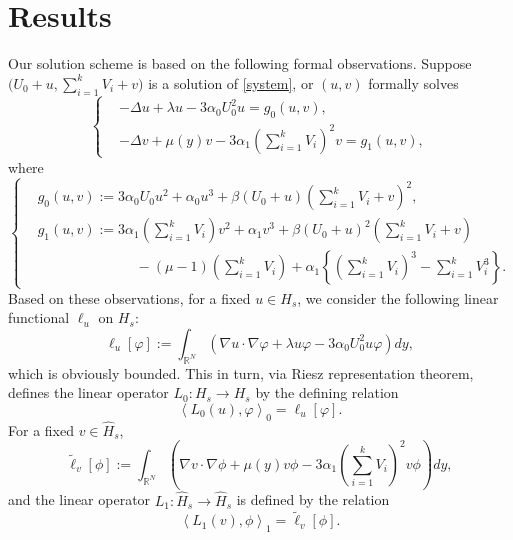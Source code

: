 \documentclass{amsart}
\theoremstyle{definition}
\theoremstyle{remark}
\numberwithin{equation}{section}
\begin{document}
\section{Results} \label{sec:result}
Our solution scheme is based on the following formal observations. Suppose $\Big(U_0 +u, \displaystyle \sum_{i=1}^k V_i + v\Big)$ is a solution of \eqref{system}, or $(u,v)$ formally solves
\begin{equation*}
 \left\{
 \begin{aligned}
 &-\Delta u + \lambda u - 3\alpha_0U_0^2 u =g_0(u,v),  \\
 &-\Delta v + \mu(y) v - 3\alpha_1\left(\sum_{i=1}^k V_{i}\right)^2 v =g_1(u,v),  
 \end{aligned}
 \right.
\end{equation*}
where
\begin{equation*}
 \left\{
 \begin{aligned}
 & g_0(u,v):=3\alpha_0U_{ {0}} u^2 + \alpha_0u^3 + \beta(U_0+u)\left(\sum_{i=1}^k V_{i} +v\right)^2,\\
 & g_1(u,v):= 3\alpha_1\left(\sum_{i=1}^k V_{i}\right)v^2 + \alpha_1v^3 + \beta\left(U_0 +u\right)^2\left(\sum_{i=1}^k V_{i} +v\right)  \\
 & \quad \quad \quad \quad \quad \quad \quad - (\mu-1)\left(\sum_{i=1}^k V_{i}\right)+ \alpha_1\left\{ \left(\sum_{i=1}^k V_{i}\right)^3 - \sum_{i=1}^k V_{i}^3 \right\}.
 \end{aligned}
 \right.
\end{equation*}
Based on these observations, for a fixed $u \in H_s$, we consider the following linear functional $\ell_u$ on $H_s$:
$$\ell_u[\varphi] := \int_{ \mathbb{R}^N}\left( \nabla u\cdot\nabla\varphi + \lambda u \varphi - 3\alpha_0 U_0^2 u\varphi\right)dy,$$
which is obviously bounded. This in turn, via Riesz representation theorem, defines the linear operator $L_0: H_s\rightarrow H_s$ by the defining relation
\begin{equation}\label{l0}\left<L_0(u),\varphi\right>_0 = \ell_u[\varphi].\end{equation}
For a fixed $v \in \hat{H}_s$,
$$\tilde\ell_v[\phi]:=\int_{ \mathbb{R}^N}\left( \nabla v\cdot\nabla\phi + \mu(y) v \phi - 3\alpha_1 \left(\sum_{i=1}^k V_{i}\right)^2 v\phi\right)dy,$$
and the linear operator $L_1: \hat{H}_s \rightarrow \hat{H}_s$ is defined by the relation
\begin{equation}\label{l1}\left<L_1(v),\phi\right>_1 = \tilde\ell_v[\phi].\end{equation}
\end{document}
